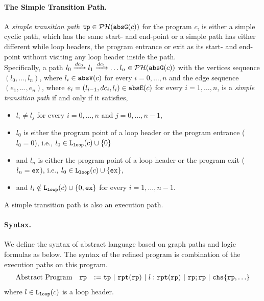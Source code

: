   \paragraph{The Simple Transition Path.}
  \begin{defn}
  \label{def:tpath}
A \emph{simple transition path}
$\mathtt{tp} \in \mathcal{PH}(\mathtt{abs}{\mathtt{G}}(c))$ for the program $c$, is either a simple cyclic path, which has the same start- and end-point
or a simple path has either different while loop headers, the program entrance or exit as its start- and end-point
without visiting any loop header inside the path.
\\
Specifically, a path $l_0 \xrightarrow{dc_0} l_1 \xrightarrow{dc_1} \ldots l_n \in \mathcal{PH}(\mathtt{abs}{\mathtt{G}}(c))$ with the
vertices sequence $(l_0, \ldots, l_n)$, where $l_i \in \mathtt{abs}{\mathtt{V}}(c)$ for every $i = 0, \ldots, n$ and
%
the edge sequence $(e_1, \ldots, e_n)$, where $e_i = (l_{i - 1}, dc_i, l_{i}) \in \mathtt{abs}{\mathtt{E}}(c)$ for every $i = 1, \ldots, n$,
%
is a \emph{simple transition path} if and only if it satisfies,
\begin{itemize}
  \item $l_i \neq l_j$ for every $i = 0, \ldots, n$ and $j = 0, \ldots, {n - 1}$,
  \item $l_0$ is either the program point of a loop header or the program entrance ($l_0 = 0$),
  i.e., $l_0 \in \mathtt{L}_{\mathtt{loop}}(c) \cup \{ 0 \}$
  \item and $l_n$ is either the program point of a loop header or the program exit ($l_n = \mathtt{ex}$),
  i.e., $l_0 \in \mathtt{L}_{\mathtt{loop}}(c) \cup \{ \mathtt{ex} \}$,
  \item and $l_i \notin \mathtt{L}_{\mathtt{loop}}(c) \cup \{ 0, \mathtt{ex} \}$ for every $i = 1, \ldots, n-1$.
\end{itemize}
\end{defn}
A simple transition path is also an execution path.

\paragraph{Syntax.}
We define the syntax of abstract language based on graph paths and logic formulas as below. 
The syntax of the refined program is combination of the execution paths on this program.
\[
  \begin{array}{rll}
   \mbox{Abstract Program} & \rprog &:= \tpath ~|~ \rprepeat(\rprog) ~|~ l : \rprepeat(\rprog) ~|~ \rprog;\rprog ~|~ \rpchoose{\rprog, \ldots} \\
  \end{array}
\]
where $l\in \mathtt{L}_{\mathtt{loop}}(c)$ is a loop header.

